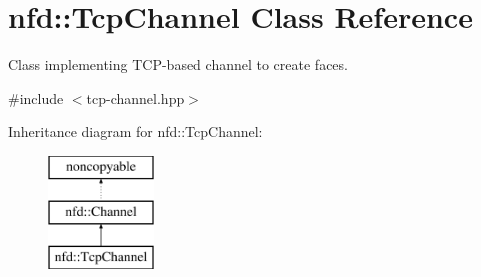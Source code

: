 \hypertarget{classnfd_1_1TcpChannel}{}\section{nfd\+:\+:Tcp\+Channel Class Reference}
\label{classnfd_1_1TcpChannel}


Class implementing T\+C\+P-\/based channel to create faces.  




{\ttfamily \#include $<$tcp-\/channel.\+hpp$>$}

Inheritance diagram for nfd\+:\+:Tcp\+Channel\+:\begin{figure}[H]
\begin{center}
\leavevmode
\includegraphics[height=3.000000cm]{classnfd_1_1TcpChannel}
\end{center}
\end{figure}
